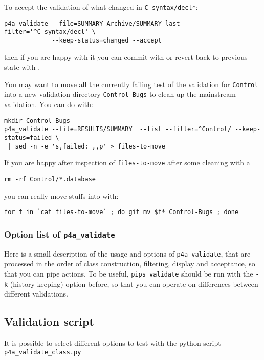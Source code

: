 \documentclass[a4paper]{article}
\begin{document}
To accept the validation of what changed in \texttt{C\_syntax/decl\emph{*}}:
\begin{verbatim}
p4a_validate --file=SUMMARY_Archive/SUMMARY-last --filter='^C_syntax/decl' \
             --keep-status=changed --accept
\end{verbatim}
then if you are happy with it you can commit with \Agit or revert back to
previous state with \Agit.

You may want to move all the currently failing test of the validation for
\texttt{Control} into a new validation directory \texttt{Control-Bugs} to
clean up the mainstream validation. You can do with:
\begin{verbatim}
mkdir Control-Bugs
p4a_validate --file=RESULTS/SUMMARY  --list --filter=^Control/ --keep-status=failed \
 | sed -n -e 's,failed: ,,p' > files-to-move
\end{verbatim}
If you are happy after inspection of \texttt{files-to-move} after some
cleaning with a
\begin{verbatim}
rm -rf Control/*.database
\end{verbatim}
you can really move stuffs into with:
\begin{verbatim}
for f in `cat files-to-move` ; do git mv $f* Control-Bugs ; done
\end{verbatim}


\subsubsection{Option list of \protect\texttt{p4a\_validate}}
\label{sec:opti-list-p4a_v-1}

Here is a small description of the usage and options of
\verb|p4a_validate|, that are processed in the order of class
construction, filtering, display and acceptance, so that you can pipe
actions. To be useful, \verb|pips_validate| should be run with the
\texttt{-k} (history keeping) option before, so that you can operate on
differences between different validations.




\subsection{Validation script}
\label{sec:validation_script}

It is possible to select different options to test with the python script
\verb|p4a_validate_class.py|
\end{document}
